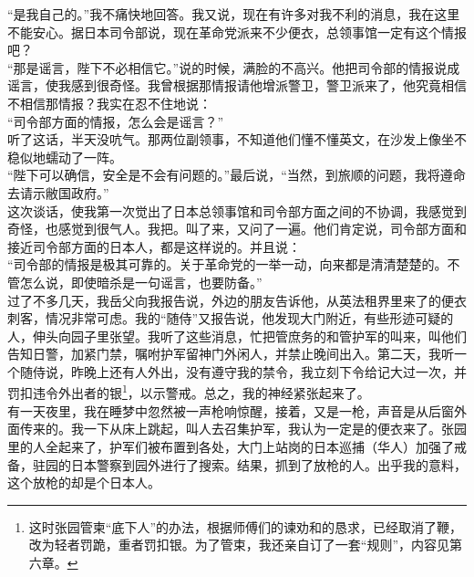 “是我自己的。”我不痛快地回答。我又说，现在有许多对我不利的消息，我在这里不能安心。据日本司令部说，现在革命党派来不少便衣，总领事馆一定有这个情报吧？\\

“那是谣言，陛下不必相信它。”说的时候，满脸的不高兴。他把司令部的情报说成谣言，使我感到很奇怪。我曾根据那情报请他增派警卫，警卫派来了，他究竟相信不相信那情报？我实在忍不住地说：\\

“司令部方面的情报，怎么会是谣言？”\\

听了这话，半天没吭气。那两位副领事，不知道他们懂不懂英文，在沙发上像坐不稳似地蠕动了一阵。\\

“陛下可以确信，安全是不会有问题的。”最后说，“当然，到旅顺的问题，我将遵命去请示敝国政府。”\\

这次谈话，使我第一次觉出了日本总领事馆和司令部方面之间的不协调，我感觉到奇怪，也感觉到很气人。我把。叫了来，又问了一遍。他们肯定说，司令部方面和接近司令部方面的日本人，都是这样说的。并且说：\\

“司令部的情报是极其可靠的。关于革命党的一举一动，向来都是清清楚楚的。不管怎么说，即使暗杀是一句谣言，也要防备。”\\

过了不多几天，我岳父向我报告说，外边的朋友告诉他，从英法租界里来了的便衣刺客，情况非常可虑。我的“随侍”又报告说，他发现大门附近，有些形迹可疑的人，伸头向园子里张望。我听了这些消息，忙把管庶务的和管护军的叫来，叫他们告知日警，加紧门禁，嘱咐护军留神门外闲人，并禁止晚间出入。第二天，我听一个随侍说，昨晚上还有人外出，没有遵守我的禁令，我立刻下令给记大过一次，并罚扣违令外出者的银\footnote{这时张园管柬“底下人”的办法，根据师傅们的谏劝和的恳求，已经取消了鞭，改为轻者罚跪，重者罚扣银。为了管束，我还亲自订了一套“规则”，内容见第六章。}，以示警戒。总之，我的神经紧张起来了。\\

有一天夜里，我在睡梦中忽然被一声枪响惊醒，接着，又是一枪，声音是从后窗外面传来的。我一下从床上跳起，叫人去召集护军，我认为一定是的便衣来了。张园里的人全起来了，护军们被布置到各处，大门上站岗的日本巡捕（华人）加强了戒备，驻园的日本警察到园外进行了搜索。结果，抓到了放枪的人。出乎我的意料，这个放枪的却是个日本人。\\

